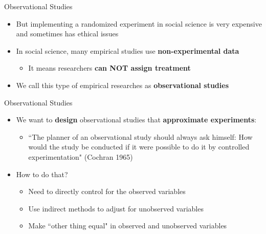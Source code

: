 \documentclass[dvipsnames,hyperref={pdfpagelabels=false}]{beamer}
\begin{document}
\begin{frame}{Observational Studies}
	\begin{itemize} 
		
		\item But implementing a randomized experiment in social science is very expensive and sometimes has ethical issues
		\vspace{0.3cm}
		\item In social science, many empirical studies use \textbf{non-experimental data} 
		\vspace{0.3cm}
			\begin{itemize} 
	\item It means researchers \textbf{can NOT assign treatment	}
			\end{itemize}
				\vspace{0.3cm}
		\item We call this type of empirical researches as \textbf{observational studies}
		
	\end{itemize}
\end{frame}


\begin{frame}{Observational Studies}
	\begin{itemize} 
	
		\item We want to \textbf{design} observational studies that \textbf{approximate experiments}:
		\begin{itemize}
			\vspace{0.3cm}
			\item ``The planner of an observational study should always ask himself: How would the study be conducted if it were possible to do it by controlled experimentation" (Cochran 1965)
		\end{itemize}
				\vspace{0.3cm}
	\item How to do that?
					\vspace{0.3cm}
				\begin{itemize}			
	\item Need to directly control for the observed variables
		\vspace{0.3cm}
	\item Use indirect methods to adjust for unobserved variables
	\vspace{0.3cm}
	\item Make ``other thing equal" in observed and unobserved variables
		\end{itemize}
	\end{itemize}
\end{frame}
\end{document}
